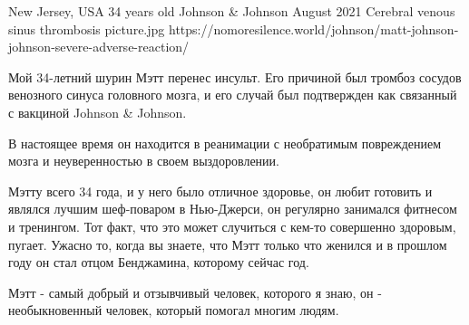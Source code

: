           {New Jersey, USA}
          {34 years old}
          {Johnson \& Johnson}
          {August 2021}
          {Cerebral venous sinus thrombosis}
          {picture.jpg}
          {https://nomoresilence.world/johnson/matt-johnson-johnson-severe-adverse-reaction/}
          {

Мой 34-летний шурин Мэтт перенес инсульт. Его причиной был тромбоз сосудов
венозного синуса головного мозга, и его случай был подтвержден как связанный с
вакциной Johnson \& Johnson.

В настоящее время он находится в реанимации с необратимым повреждением мозга и
неуверенностью в своем выздоровлении.

Мэтту всего 34 года, и у него было отличное здоровье, он любит готовить и
являлся лучшим шеф-поваром в Нью-Джерси, он регулярно занимался фитнесом и
тренингом. Тот факт, что это может случиться с кем-то совершенно здоровым,
пугает. Ужасно то, когда вы знаете, что Мэтт только что женился и в прошлом году
он стал отцом Бенджамина, которому сейчас год.

Мэтт - самый добрый и отзывчивый человек, которого я знаю, он - необыкновенный
человек, который помогал многим людям.

}
